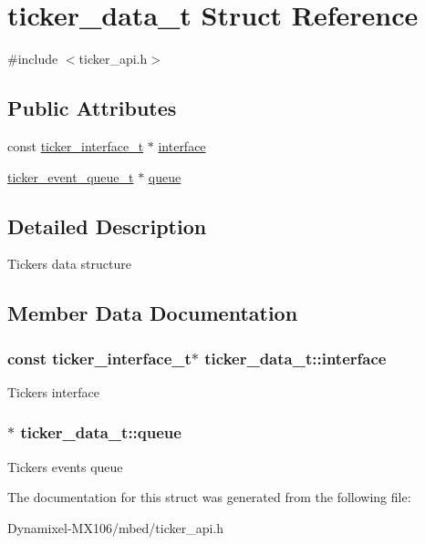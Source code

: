 \hypertarget{structticker__data__t}{}\section{ticker\+\_\+data\+\_\+t Struct Reference}
\label{structticker__data__t}


{\ttfamily \#include $<$ticker\+\_\+api.\+h$>$}

\subsection*{Public Attributes}
\begin{DoxyCompactItemize}
\item 
const \hyperlink{structticker__interface__t}{ticker\+\_\+interface\+\_\+t} $\ast$ \hyperlink{structticker__data__t_a0718095e14627caae5e4654fb8c0f300}{interface}
\item 
\hyperlink{structticker__event__queue__t}{ticker\+\_\+event\+\_\+queue\+\_\+t} $\ast$ \hyperlink{structticker__data__t_af531ed914f4a6dd105cf4e801d4d26b2}{queue}
\end{DoxyCompactItemize}


\subsection{Detailed Description}
Tickers data structure 

\subsection{Member Data Documentation}
\subsubsection[{\texorpdfstring{interface}{interface}}]{\setlength{\rightskip}{0pt plus 5cm}const {\bf ticker\+\_\+interface\+\_\+t}$\ast$ ticker\+\_\+data\+\_\+t\+::interface}\hypertarget{structticker__data__t_a0718095e14627caae5e4654fb8c0f300}{}\label{structticker__data__t_a0718095e14627caae5e4654fb8c0f300}
Ticker\textquotesingle{}s interface 
\subsubsection[{\texorpdfstring{queue}{queue}}]{$\ast$ ticker\+\_\+data\+\_\+t\+::queue}\hypertarget{structticker__data__t_af531ed914f4a6dd105cf4e801d4d26b2}{}\label{structticker__data__t_af531ed914f4a6dd105cf4e801d4d26b2}
Ticker\textquotesingle{}s events queue 

The documentation for this struct was generated from the following file\+:\begin{DoxyCompactItemize}
\item 
Dynamixel-\/\+M\+X106/mbed/ticker\+\_\+api.\+h\end{DoxyCompactItemize}
